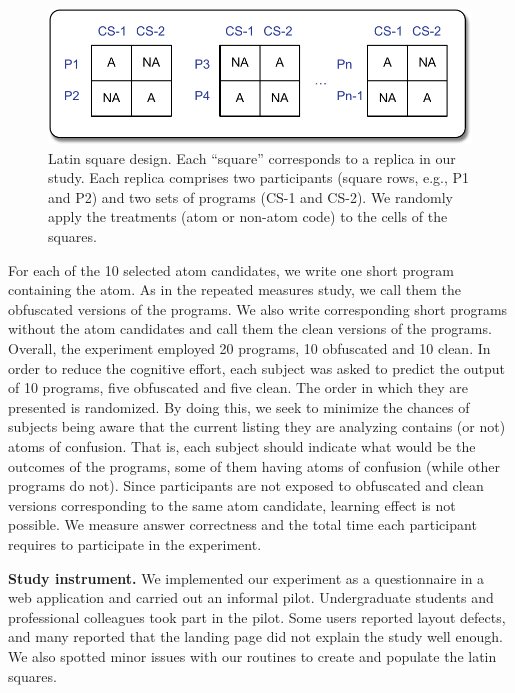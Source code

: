   \begin{figure}[htb!]
      \noindent
      \centering
      \includegraphics[scale=.50]{images/latin-square.pdf}
      \caption{Latin square design. Each ``square'' corresponds to 
      a replica in our study. Each replica comprises two participants (square rows, e.g., P1 and P2) 
      and two sets of programs (CS-1 and CS-2). We randomly apply the 
      treatments (atom or non-atom code) to the cells of the squares.} 
      \label{fig:latinsquare}
  \end{figure}

For each of the 10 selected atom candidates, we write one short program containing the atom. As in the repeated measures study, we call them the obfuscated versions of the programs. We also write corresponding short programs without the atom candidates and call them the clean versions of the programs. Overall, the experiment employed 20 programs, 10 obfuscated and 10 clean. In order to reduce the cognitive effort, each subject was asked to predict the output of 10 programs, five obfuscated and five clean. The order in which they are presented is randomized. By doing this, we seek to minimize the chances of subjects being aware that the current listing they are analyzing contains (or not) atoms of confusion. That is, each subject should indicate what would be the outcomes of the programs, some of them having atoms of confusion (while other programs do not). Since participants are not exposed to obfuscated and clean versions corresponding to the same atom candidate, learning effect is not possible. We measure answer correctness and the total time each participant requires to participate in the experiment.

{\bf Study instrument.} 
We implemented our experiment as a questionnaire in a web application and 
carried out an informal pilot. Undergraduate students and professional colleagues took part in the pilot. Some users reported layout defects, and many reported that the landing page did not explain the study well enough. We also spotted minor issues with our routines to create and populate the latin squares. 

